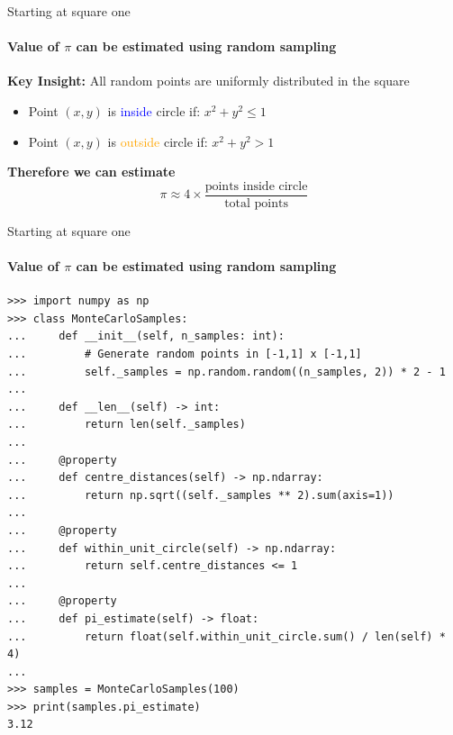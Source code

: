 \documentclass{beamer}
\begin{document}
\begin{frame}{Starting at square one}
\framesubtitle{Value of $\pi$ can be estimated using random sampling}
  \textbf{Key Insight:} All random points are uniformly distributed in the square

  \begin{itemize}
    \item Point $(x,y)$ is \textcolor{blue}{inside} circle if: $x^2 + y^2 \leq 1$
    \item Point $(x,y)$ is \textcolor{orange}{outside} circle if: $x^2 + y^2 > 1$
  \end{itemize}
  
  \vspace{0.5cm}
  \textbf{Therefore we can estimate}
  $$\pi \approx 4 \times \frac{\text{points inside circle}}{\text{total points}}$$
\end{frame}

\begin{frame}[fragile]{Starting at square one}
\framesubtitle{Value of $\pi$ can be estimated using random sampling}
\begin{lstlisting}
>>> import numpy as np
>>> class MonteCarloSamples:
...     def __init__(self, n_samples: int):
...         # Generate random points in [-1,1] x [-1,1]
...         self._samples = np.random.random((n_samples, 2)) * 2 - 1
...
...     def __len__(self) -> int:
...         return len(self._samples)
...
...     @property
...     def centre_distances(self) -> np.ndarray:
...         return np.sqrt((self._samples ** 2).sum(axis=1))
...     
...     @property
...     def within_unit_circle(self) -> np.ndarray:
...         return self.centre_distances <= 1
...     
...     @property
...     def pi_estimate(self) -> float:
...         return float(self.within_unit_circle.sum() / len(self) * 4)
...
>>> samples = MonteCarloSamples(100)
>>> print(samples.pi_estimate)
3.12
\end{lstlisting}
\end{frame}
\end{document}
